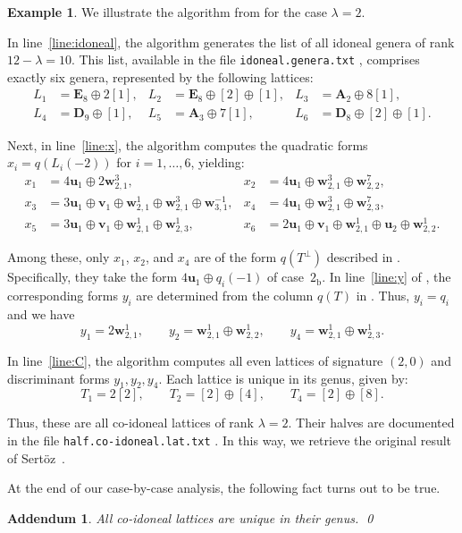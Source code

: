 \documentclass[a4paper]{amsart}
\theoremstyle{definition}
\newtheorem{example}[definition]{Example}
\theoremstyle{plain}
\newtheorem{addendum}[definition]{Addendum}
\newcommand{\bA}{\mathbf{A}}
\newcommand{\bD}{\mathbf{D}}
\newcommand{\bE}{\mathbf{E}}
\newcommand{\bu}{\mathbf{u}}
\newcommand{\bv}{\mathbf{v}}
\newcommand{\bw}{\mathbf{w}}
\begin{document}
\begin{example}
We illustrate the algorithm from  for the case \(\lambda = 2\).

In line~\ref{line:idoneal}, the algorithm generates the list of all idoneal genera of rank \(12 - \lambda = 10\). This list, available in the file \verb+idoneal.genera.txt+ \cite{brandhorst_2024_10617125}, comprises exactly six genera, represented by the following lattices:
\begin{align*}
    L_1 &= \bE_8 \oplus 2[1], & 
    L_2 &= \bE_8 \oplus [2] \oplus [1], &
    L_3 &= \bA_2 \oplus 8[1], \\
    L_4 &= \bD_9 \oplus [1], &
    L_5 &= \bA_3 \oplus 7[1], &
    L_6 &= \bD_8 \oplus [2] \oplus [1].
\end{align*}

Next, in line~\ref{line:x}, the algorithm computes the quadratic forms \(x_i = q(L_i(-2))\) for \(i = 1, \ldots, 6\), yielding:
\begin{align*}
    x_1 &= 4\bu_1 \oplus 2\bw_{2,1}^3, & 
    x_2 &= 4\bu_1 \oplus \bw_{2,1}^3 \oplus \bw_{2,2}^7, \\
    x_3 &= 3\bu_1 \oplus \bv_1 \oplus \bw_{2,1}^1 \oplus \bw_{2,1}^3 \oplus \bw_{3,1}^{-1}, &
    x_4 &= 4\bu_1 \oplus \bw_{2,1}^3 \oplus \bw_{2,3}^7, \\
    x_5 &= 3\bu_1 \oplus \bv_1 \oplus \bw_{2,1}^1 \oplus \bw_{2,3}^1, &
    x_6 &= 2\bu_1 \oplus \bv_1 \oplus \bw_{2,1}^1 \oplus \bu_2 \oplus \bw_{2,2}^1.
\end{align*}

Among these, only \(x_1\), \(x_2\), and \(x_4\) are of the form \(q(T^\perp)\) described in . Specifically, they take the form \(4\bu_1 \oplus q_i(-1)\) of case~\(2_\mathrm{b}\). In line~\ref{line:y} of , the corresponding forms \(y_i\) are determined from the column \(q(T)\) in . Thus, \(y_i = q_i\) and we have
\[
    y_1 = 2\bw_{2,1}^1, \qquad 
    y_2 = \bw_{2,1}^1 \oplus \bw_{2,2}^1, \qquad  
    y_4 = \bw_{2,1}^1 \oplus \bw_{2,3}^1.
\]

In line~\ref{line:C}, the algorithm computes all even lattices of signature \((2, 0)\) and discriminant forms \(y_1, y_2, y_4\). Each lattice is unique in its genus, given by:
\[
    T_1 = 2[2], \qquad T_2 = [2] \oplus [4], \qquad T_4 = [2] \oplus [8].
\]

Thus, these are all co-idoneal lattices of rank \(\lambda = 2\). Their halves are documented in the file \verb+half.co-idoneal.lat.txt+ \cite{brandhorst_2024_10617125}. In this way, we retrieve the original result of Sertöz~\cite{Sertoez05}.
\end{example}

At the end of our case-by-case analysis, the following fact turns out to be true.

\begin{addendum}
All co-idoneal lattices are unique in their genus.
\qed
\end{addendum}


\printbibliography
\end{document}
